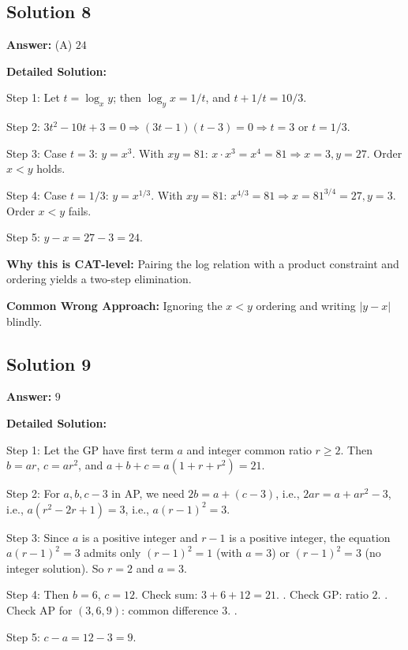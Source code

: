 \documentclass[11pt]{article}
\begin{document}
\subsection*{Solution 8}

\textbf{Answer:} (A) \(24\)

\textbf{Detailed Solution:}

Step 1: Let \(t = \log_x y\); then \(\log_y x = 1/t\), and \(t + 1/t = 10/3\).

Step 2: \(3t^2 - 10t + 3 = 0 \Rightarrow (3t-1)(t-3)=0 \Rightarrow t = 3\) or \(t = 1/3\).

Step 3: Case \(t=3\): \(y = x^3\). With \(xy = 81\): \(x \cdot x^3 = x^4 = 81 \Rightarrow x = 3, y = 27\). Order \(x<y\) holds. \checkmark

Step 4: Case \(t=1/3\): \(y = x^{1/3}\). With \(xy = 81\): \(x^{4/3} = 81 \Rightarrow x = 81^{3/4} = 27, y = 3\). Order \(x<y\) fails.

Step 5: \(y - x = 27 - 3 = 24\).

\textbf{Why this is CAT-level:} Pairing the log relation with a product constraint and ordering yields a two-step elimination.

\textbf{Common Wrong Approach:} Ignoring the \(x<y\) ordering and writing \(|y-x|\) blindly.

\subsection*{Solution 9}

\textbf{Answer:} \(9\)

\textbf{Detailed Solution:}

Step 1: Let the GP have first term \(a\) and integer common ratio \(r \ge 2\). Then \(b = a r\), \(c = a r^2\), and \(a + b + c = a(1 + r + r^2) = 21\).

Step 2: For \(a, b, c-3\) in AP, we need \(2b = a + (c - 3)\), i.e., \(2 a r = a + a r^2 - 3\), i.e., \(a(r^2 - 2r + 1) = 3\), i.e., \(a(r-1)^2 = 3\).

Step 3: Since \(a\) is a positive integer and \(r-1\) is a positive integer, the equation \(a(r-1)^2 = 3\) admits only \((r-1)^2 = 1\) (with \(a=3\)) or \((r-1)^2 = 3\) (no integer solution). So \(r = 2\) and \(a = 3\).

Step 4: Then \(b = 6\), \(c = 12\). Check sum: \(3+6+12=21\). \checkmark. Check GP: ratio \(2\). \checkmark. Check AP for \((3, 6, 9)\): common difference \(3\). \checkmark.

Step 5: \(c - a = 12 - 3 = 9\).
\end{document}
